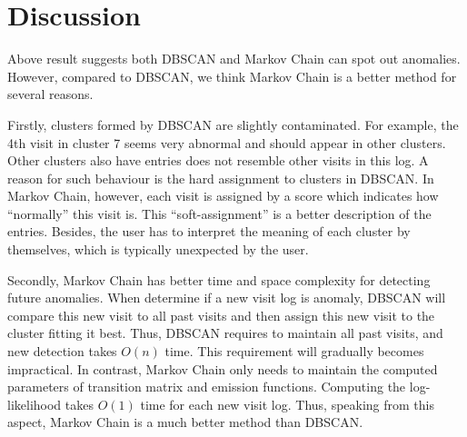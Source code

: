 \section{Discussion}
\label{sec:discuss}
Above result suggests both DBSCAN and Markov Chain can spot out anomalies. However, compared to DBSCAN, we think Markov Chain is a better method for several reasons. 

Firstly, clusters formed by DBSCAN are slightly contaminated. For example, the 4th visit in cluster 7 seems very abnormal and should appear in other clusters. Other clusters also have entries does not resemble other visits in this log. A reason for such behaviour is the hard assignment to clusters in DBSCAN. In Markov Chain, however, each visit is assigned by a score which indicates how ``normally'' this visit is. This ``soft-assignment'' is a better description of the entries. Besides, the user has to interpret the meaning of each cluster by themselves, which is typically unexpected by the user.

Secondly, Markov Chain has better time and space complexity for detecting future anomalies. When determine if a new visit log is anomaly, DBSCAN will compare this new visit to all past visits and then assign this new visit to the cluster fitting it best. Thus, DBSCAN requires to maintain all past visits, and new detection takes $O(n)$ time. This requirement will gradually becomes impractical. In contrast, Markov Chain only needs to maintain the computed parameters of transition matrix and emission functions. Computing the log-likelihood takes $O(1)$ time for each new visit log. Thus, speaking from this aspect, Markov Chain is a much better method than DBSCAN.
